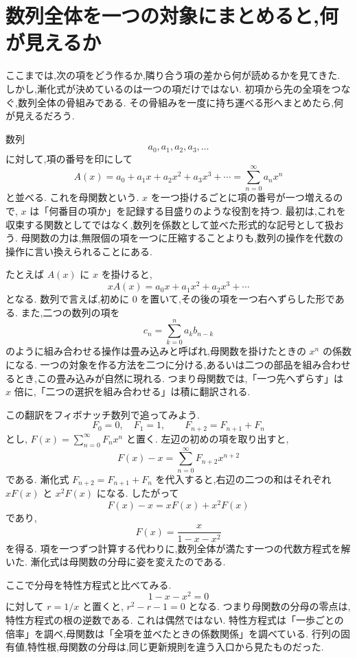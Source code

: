 
\section{数列全体を一つの対象にまとめると,何が見えるか}

ここまでは,次の項をどう作るか,隣り合う項の差から何が読めるかを見てきた.
しかし,漸化式が決めているのは一つの項だけではない.
初項から先の全項をつなぐ,数列全体の骨組みである.
その骨組みを一度に持ち運べる形へまとめたら,何が見えるだろう.

数列
\[
  a_0,a_1,a_2,a_3,\ldots
\]
に対して,項の番号を印にして
\[
  A(x)=a_0+a_1x+a_2x^2+a_3x^3+\cdots
  =\sum_{n=0}^{\infty}a_nx^n
\]
と並べる.
これを母関数という.
$x$ を一つ掛けるごとに項の番号が一つ増えるので,\,\,$x$ は「何番目の項か」を記録する目盛りのような役割を持つ.
最初は,これを収束する関数としてではなく,数列を係数として並べた形式的な記号として扱おう.
母関数の力は,無限個の項を一つに圧縮することよりも,数列の操作を代数の操作に言い換えられることにある.

たとえば $A(x)$ に $x$ を掛けると,
\[
  xA(x)=a_0x+a_1x^2+a_2x^3+\cdots
\]
となる.
数列で言えば,初めに $0$ を置いて,その後の項を一つ右へずらした形である.
また,二つの数列の項を
\[
  c_n=\sum_{k=0}^{n}a_kb_{n-k}
\]
のように組み合わせる操作は畳み込みと呼ばれ,母関数を掛けたときの $x^n$ の係数になる.
一つの対象を作る方法を二つに分ける,あるいは二つの部品を組み合わせるとき,この畳み込みが自然に現れる.
つまり母関数では,「一つ先へずらす」は $x$ 倍に,「二つの選択を組み合わせる」は積に翻訳される.

この翻訳をフィボナッチ数列で追ってみよう.
\[
  F_0=0,\quad F_1=1,\qquad F_{n+2}=F_{n+1}+F_n
\]
とし,\,\,$F(x)=\sum_{n=0}^{\infty}F_nx^n$ と置く.
左辺の初めの項を取り出すと,
\[
  F(x)-x=\sum_{n=0}^{\infty}F_{n+2}x^{n+2}
\]
である.
漸化式 $F_{n+2}=F_{n+1}+F_n$ を代入すると,右辺の二つの和はそれぞれ $xF(x)$ と $x^2F(x)$ になる.
したがって
\[
  F(x)-x=xF(x)+x^2F(x)
\]
であり,
\[
  F(x)=\frac{x}{1-x-x^2}
\]
を得る.
項を一つずつ計算する代わりに,数列全体が満たす一つの代数方程式を解いた.
漸化式は母関数の分母に姿を変えたのである.

ここで分母を特性方程式と比べてみる.
\[
  1-x-x^2=0
\]
に対して $r=1/x$ と置くと,\,\,$r^2-r-1=0$ となる.
つまり母関数の分母の零点は,特性方程式の根の逆数である.
これは偶然ではない.
特性方程式は「一歩ごとの倍率」を調べ,母関数は「全項を並べたときの係数関係」を調べている.
行列の固有値,特性根,母関数の分母は,同じ更新規則を違う入口から見たものだった.

